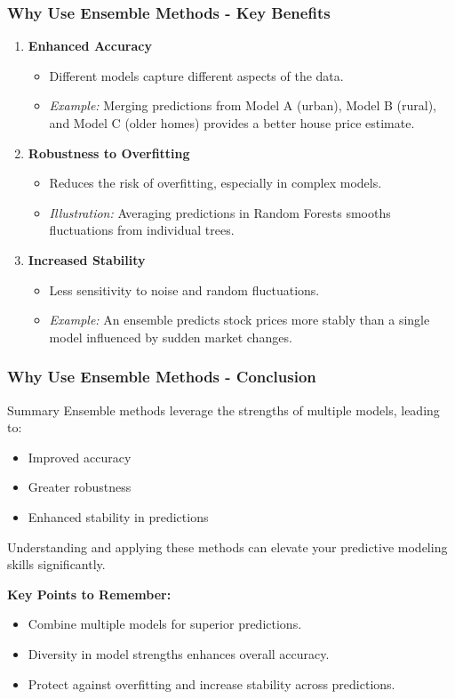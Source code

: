 \documentclass[aspectratio=169]{beamer}
\begin{document}
\begin{frame}[fragile]
    \frametitle{Why Use Ensemble Methods - Key Benefits}
    \begin{enumerate}
        \item \textbf{Enhanced Accuracy}
            \begin{itemize}
                \item Different models capture different aspects of the data.
                \item \textit{Example:} Merging predictions from Model A (urban), Model B (rural), and Model C (older homes) provides a better house price estimate.
            \end{itemize}
        \item \textbf{Robustness to Overfitting}
            \begin{itemize}
                \item Reduces the risk of overfitting, especially in complex models.
                \item \textit{Illustration:} Averaging predictions in Random Forests smooths fluctuations from individual trees.
            \end{itemize}
        \item \textbf{Increased Stability}
            \begin{itemize}
                \item Less sensitivity to noise and random fluctuations.
                \item \textit{Example:} An ensemble predicts stock prices more stably than a single model influenced by sudden market changes.
            \end{itemize}
    \end{enumerate}
\end{frame}

\begin{frame}[fragile]
    \frametitle{Why Use Ensemble Methods - Conclusion}
    \begin{block}{Summary}
        Ensemble methods leverage the strengths of multiple models, leading to:
        \begin{itemize}
            \item Improved accuracy
            \item Greater robustness
            \item Enhanced stability in predictions
        \end{itemize}
        Understanding and applying these methods can elevate your predictive modeling skills significantly.
    \end{block}
    \textbf{Key Points to Remember:}
    \begin{itemize}
        \item Combine multiple models for superior predictions.
        \item Diversity in model strengths enhances overall accuracy.
        \item Protect against overfitting and increase stability across predictions.
    \end{itemize}
\end{frame}
\end{document}

